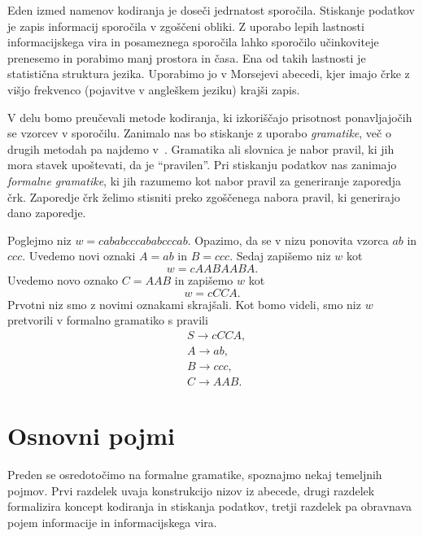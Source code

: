 \documentclass[fin1, tisk]{fmfdelo}
\theoremstyle{definition}
\begin{document}
Eden izmed namenov kodiranja je doseči jedrnatost sporočila. Stiskanje podatkov 
je zapis informacij sporočila v zgoščeni obliki. Z uporabo lepih lastnosti informacijskega vira 
in posameznega sporočila lahko sporočilo učinkoviteje prenesemo in porabimo manj prostora in časa.
Ena od takih lastnosti je statistična struktura jezika. Uporabimo jo v Morsejevi abecedi, kjer
imajo črke z višjo frekvenco (pojavitve v angleškem jeziku) krajši zapis. %

V delu bomo preučevali metode kodiranja, ki izkoriščajo prisotnost ponavljajočih se vzorcev
v sporočilu. Zanimalo nas bo stiskanje z uporabo \emph{gramatike}, več o drugih metodah pa najdemo 
v~\cite{Sayood2017}. Gramatika ali slovnica je nabor pravil, ki jih mora stavek 
upoštevati, da je ``pravilen''. Pri stiskanju podatkov nas zanimajo \emph{formalne gramatike}, 
ki jih razumemo kot nabor pravil za generiranje zaporedja črk. Zaporedje črk želimo 
stisniti preko zgoščenega nabora pravil, ki generirajo dano zaporedje.

\begin{primer}
    \label{primer:motivacija}
    Poglejmo niz $w =\mathit{cababcccababcccab}$.
    Opazimo, da se v nizu ponovita vzorca $\mathit{ab}$ in $\mathit{ccc}$. Uvedemo novi oznaki
    $A = \mathit{ab}$ in $B = \mathit{ccc}$. Sedaj zapišemo niz $w$ kot
    \[
        w = \mathit{cAABAABA}.
    \]
    Uvedemo novo oznako $C = \mathit{AAB}$
    in zapišemo $w$ kot
    \[
        w = \mathit{cCCA}.
    \]
    Prvotni niz smo z novimi oznakami skrajšali. Kot bomo videli, smo niz $w$ pretvorili v 
    formalno gramatiko s pravili
    \begin{align*}
        & S  \rightarrow \mathit{cCCA}, \\
        & A  \rightarrow \mathit{ab}, \\
        & B  \rightarrow \mathit{ccc}, \\
        & C  \rightarrow \mathit{AAB}.
    \end{align*}
\end{primer}

\section{Osnovni pojmi}

Preden se osredotočimo na formalne gramatike, spoznajmo nekaj temeljnih pojmov.
Prvi razdelek uvaja konstrukcijo nizov iz abecede, drugi razdelek formalizira koncept kodiranja 
in stiskanja podatkov, tretji razdelek pa obravnava pojem informacije in informacijskega vira.
\end{document}
